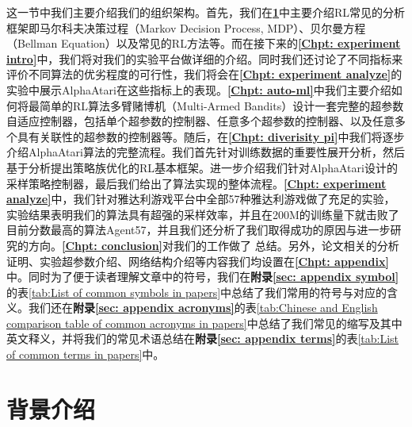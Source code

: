 这一节中我们主要介绍我们的组织架构。首先，我们在\textbf{\ref{Chpt: Reinforcement Learning}}中主要介绍RL常见的分析框架即马尔科夫决策过程（Markov Decision Process, MDP）、贝尔曼方程（Bellman Equation）以及常见的RL方法等。而在接下来的\textbf{\ref{Chpt: experiment intro}}中，我们将对我们的实验平台做详细的介绍。同时我们还讨论了不同指标来评价不同算法的优劣程度的可行性，我们将会在\textbf{\ref{Chpt: experiment analyze}}的实验中展示AlphaAtari在这些指标上的表现。\textbf{\ref{Chpt: auto-ml}}中我们主要介绍如何将最简单的RL算法多臂赌博机（Multi-Armed Bandits）设计一套完整的超参数自适应控制器，包括单个超参数的控制器、任意多个超参数的控制器、以及任意多个具有关联性的超参数的控制器等。随后，在\textbf{\ref{Chpt: diverisity pi}}中我们将逐步介绍AlphaAtari算法的完整流程。我们首先针对训练数据的重要性展开分析，然后基于分析提出策略族优化的RL基本框架。进一步介绍我们针对AlphaAtari设计的采样策略控制器，最后我们给出了算法实现的整体流程。\textbf{\ref{Chpt: experiment analyze}}中，我们针对雅达利游戏平台中全部57种雅达利游戏做了充足的实验，实验结果表明我们的算法具有超强的采样效率，并且在200M的训练量下就击败了目前分数最高的算法Agent57，并且我们还分析了我们取得成功的原因与进一步研究的方向。\textbf{\ref{Chpt: conclusion}}对我们的工作做了
总结。另外，论文相关的分析证明、实验超参数介绍、网络结构介绍等内容我们均设置在\textbf{\ref{Chpt: appendix}}中。同时为了便于读者理解文章中的符号，我们在\textbf{附录\ref{sec: appendix symbol}}的表\ref{tab:List of common symbols in papers}中总结了我们常用的符号与对应的含义。我们还在\textbf{附录\ref{sec: appendix acronyms}}的表\ref{tab:Chinese and English comparison table of common acronyms in papers}中总结了我们常见的缩写及其中英文释义，并将我们的常见术语总结在\textbf{附录\ref{sec: appendix terms}}的表\ref{tab:List of common terms in papers}中。

\chapter{背景介绍}
\label{Chpt: Reinforcement Learning}

